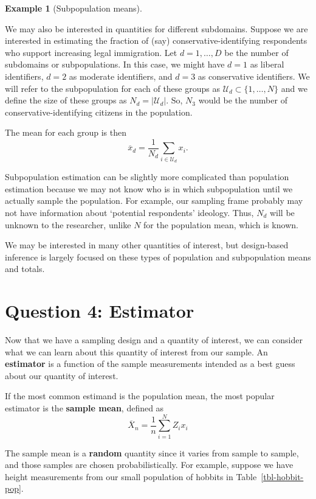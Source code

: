 \documentclass[
  13pt,
  letterpaper,
  DIV=11,
  numbers=noendperiod]{scrreprt}
\theoremstyle{plain}
\theoremstyle{plain}
\theoremstyle{definition}
\theoremstyle{definition}
\newtheorem{example}{Example}[chapter]
\theoremstyle{remark}
\begin{document}
\begin{example}[Subpopulation
means]\protect\hypertarget{exm-subpopulation}{}\label{exm-subpopulation}

We may also be interested in quantities for different subdomains.
Suppose we are interested in estimating the fraction of (say)
conservative-identifying respondents who support increasing legal
immigration. Let \(d= 1, \ldots, D\) be the number of subdomains or
subpopulations. In this case, we might have \(d = 1\) as liberal
identifiers, \(d = 2\) as moderate identifiers, and \(d = 3\) as
conservative identifiers. We will refer to the subpopulation for each of
these groups as \(\mathcal{U}_d \subset \{1,\ldots, N\}\) and we define
the size of these groups as \(N_d = |\mathcal{U}_d|\). So, \(N_3\) would
be the number of conservative-identifying citizens in the population.

The mean for each group is then \[
\overline{x}_d = \frac{1}{N_d} \sum_{i \in \mathcal{U}_d} x_i.
\]

Subpopulation estimation can be slightly more complicated than
population estimation because we may not know who is in which
subpopulation until we actually sample the population. For example, our
sampling frame probably may not have information about `potential
respondents' ideology. Thus, \(N_d\) will be unknown to the researcher,
unlike \(N\) for the population mean, which is known.

\end{example}

We may be interested in many other quantities of interest, but
design-based inference is largely focused on these types of population
and subpopulation means and totals.

\section{Question 4: Estimator}\label{question-4-estimator}

Now that we have a sampling design and a quantity of interest, we can
consider what we can learn about this quantity of interest from our
sample. An \textbf{estimator} is a function of the sample measurements
intended as a best guess about our quantity of interest.

If the most common estimand is the population mean, the most popular
estimator is the \textbf{sample mean}, defined as \[
\overline{X}_n = \frac{1}{n} \sum_{i=1}^{N}Z_ix_i
\]

The sample mean is a \textbf{random} quantity since it varies from
sample to sample, and those samples are chosen probabilistically. For
example, suppose we have height measurements from our small population
of hobbits in Table~\ref{tbl-hobbit-pop}.
\end{document}
